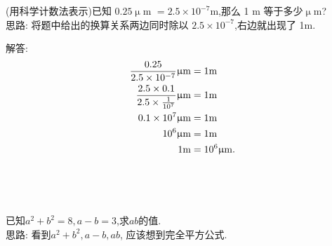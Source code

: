 \item{
    (用科学计数法表示)已知 $0.25 \upmu$m $ = 2.5\times 10^{-7}$m,那么 1 m 等于多少$\upmu$m?
    \ifshowSolution
    \fangsong{}
    \\
    思路: 将题中给出的换算关系两边同时除以 $2.5\times 10^{-7}$,右边就出现了 1m.

    解答: 
    \begin{align*}
        \frac{0.25}{2.5\times 10^{-7}} \rm{\upmu m} &= 1\rm{m}\\
        \frac{2.5\times 0.1}{2.5\times \frac{1}{10^7}} \rm{\upmu m} &= 1\rm{m}\\
        0.1\times 10^7 \rm{\upmu m} &= 1\rm{m}\\
        10^6 \rm{\upmu m} &= 1\rm{m}\\
        1\rm{m} &= 10^6 \rm{\upmu m}.
    \end{align*}
    \fi
    \unless\ifshowSolution
    \\ \\ \\
    \fi
}

\begin{comment}
    \item{
        若多项式$ 9x^2 - mx+16$是一个完全平方式,则 $m$的值是多少？
    }
    \\ \\ \\
\end{comment}

\item{
    已知$a^2+b^2=8, a-b=3$,求$ab$的值.
    \ifshowSolution
    \fangsong{}
    \\
    思路: 看到$a^2+b^2, a-b, ab$, 应该想到完全平方公式.
    \fi
    \unless\ifshowSolution
    \\ \\ \\
    \fi
}

\begin{comment}
    \item{
        若$x^2+mx+9$是完全平方式,求常数$m$的值.
    }
    \\ \\ \\

    \item{
        若$x+y=2$,求代数式$x^2-y^2+4y$的值.
    }
    \\ \\ \\
\end{comment}

